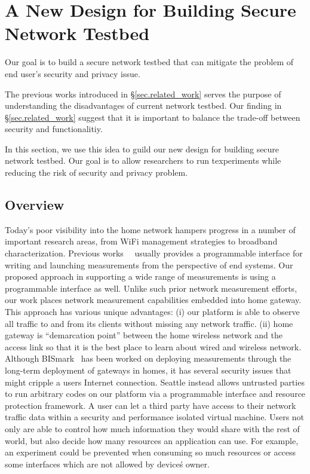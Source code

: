 \section{A New Design for Building Secure Network Testbed}
\label{sec.design}
Our goal is to build a secure network testbed that can mitigate the problem 
of end user's security and privacy issue. 

The previous works introduced in \S{\ref{sec.related_work}} serves the 
purpose of understanding the disadvantages of current network testbed. Our 
finding in \S{\ref{sec.related_work}} suggest that it is important to 
balance the trade-off between security and functionalitiy.

In this section, we use this idea to guild our new design for building 
secure network testbed. Our goal is to allow researchers to run texperiments 
while reducing the risk of security and privacy problem.

\subsection{Overview}
Today's poor visibility into the home network hampers progress in a number 
of important research areas, from WiFi management strategies to broadband 
characterization. Previous works~\cite{sanchez2014measurement}~\cite{
dhawan2012fathom} usually provides a programmable interface for writing and 
launching measurements from the perspective of end systems. Our proposed 
approach in supporting a wide range of measurements is using a programmable 
interface as well. Unlike such prior network measurement efforts, our work 
places network measurement capabilities embedded into home gateway. This 
approach has various unique advantages: (i) our platform is able to observe 
all traffic to and from its clients without missing any network traffic. (ii)
home gateway is “demarcation point” between the home wireless network and 
the access link so that it is the best place to learn about wired and 
wireless network. Although BISmark~\cite{183951} has been worked on 
deploying measurements  through the long-term deployment of gateways in 
homes, it has several security issues that might cripple a user\’s Internet 
connection. Seattle instead allows untrusted parties to run arbitrary codes 
on our platform via a programmable interface and resource protection 
framework. A user can let a third party have access to their network traffic 
data within a security and performance isolated virtual machine. Users not 
only are able to control how much information they would share with the rest 
of world, but also decide how many resources an application can use. For 
example, an experiment could be prevented when consuming so much resources 
or access some interfaces which are not allowed by device\'s owner. 

